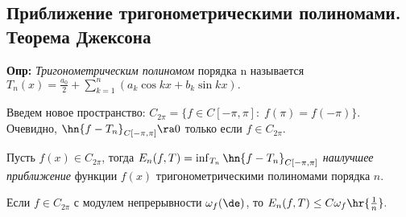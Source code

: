 \documentclass[a4paper]{article}
\begin{document}
\subsection{Приближение тригонометрическими полиномами. Теорема Джексона}
\textbf{Опр:} \emph{Тригонометрическим полиномом} порядка n
называется $T_n(x)=\frac{a_0}2+\sum_{k=1}^n (a_k\cos kx+b_k\sin
kx).$

\medskip Введем новое пространство: $C_{2\pi}=\{f\in
C[-\pi,\pi]:\;f(\pi)=f(-\pi)\}.$ Очевидно,
$\hn{f-T_n}_{C[-\pi,\pi]}\ra 0$ только если $f\in
C_{2\pi}.$

\begin{df}
  Пусть $f(x)\in C_{2\pi}$, тогда
  $E_n(f,T)=\inf_{T_n}\hn{f-T_n}_{C[-\pi,\pi]}$ \emph{наилучшее
    приближение} функции $f(x)$ тригонометрическими полиномами порядка
  $n.$
\end{df}

\begin{theorem}[Джексона] Если $f\in C_{2\pi}$ с модулем непрерывности $\omega_f(\de)$, то $E_n(f,T)\le
C\omega_f\hr{\frac1n}.$
\end{theorem}
\end{document}
